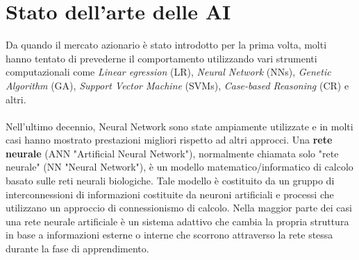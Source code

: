 \documentclass[a4paper,12pt]{report}
\begin{document}
\section{Stato dell'arte delle AI}
Da quando il mercato azionario è stato introdotto per la prima volta, molti hanno tentato di prevederne il comportamento utilizzando vari strumenti computazionali come \textit{Linear egression} (LR), \textit{Neural Network} (NNs), \textit{Genetic Algorithm} (GA), \textit{Support Vector Machine} (SVMs), \textit{Case-based Reasoning} (CR) e altri.\\~\\
Nell'ultimo decennio, Neural Network sono state ampiamente utilizzate e in molti casi hanno mostrato prestazioni migliori rispetto ad altri approcci. Una \textbf{rete neurale} (ANN "Artificial Neural Network"), normalmente chiamata solo "rete neurale" (NN "Neural Network"), è un modello matematico/informatico di calcolo basato sulle reti neurali biologiche. Tale modello è costituito da un gruppo di interconnessioni di informazioni costituite da neuroni artificiali e processi che utilizzano un approccio di connessionismo di calcolo. Nella maggior parte dei casi una rete neurale artificiale è un sistema adattivo che cambia la propria struttura in base a informazioni esterne o interne che scorrono attraverso la rete stessa durante la fase di apprendimento.\\
\end{document}
